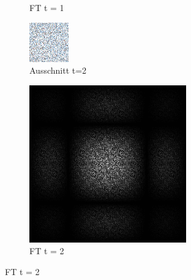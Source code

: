 \begin{figure}[H]
\begin{subfigure}[b]{0.2\linewidth}
      \caption{FT t = 1}
      \label{pic:sortier_t1}
    \end{subfigure}
    \begin{subfigure}[b]{0.2\linewidth}
      \includegraphics[width=\linewidth]{content/TemporalerAlg/Bilder/Retargeting/Bedeutung Retargeting/SortSerie/seed_debug_5.0_small_screen.png}
      \caption{Ausschnitt t=2}
      \label{pic:sortier_screen_t2}
    \end{subfigure}
    \begin{subfigure}[b]{0.2\linewidth}
        \includegraphics[width=\linewidth]{content/TemporalerAlg/Bilder/Retargeting/Bedeutung Retargeting/SortSerie/seed_debug_5.0_small.png}
        \caption{FT t = 2}
        \label{pic:sortier_t2}
      \end{subfigure}
    

\end{figure}

